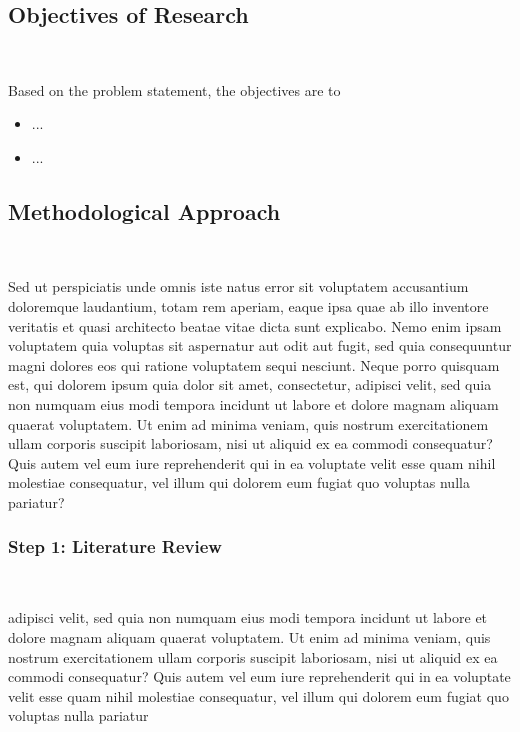 \subsection{Objectives of Research}\

Based on the problem statement, the objectives are to

\begin{itemize}
	\item ...
	\item ...
\end{itemize}


\subsection{Methodological Approach}\

Sed ut perspiciatis unde omnis iste natus error sit voluptatem accusantium doloremque laudantium, totam rem aperiam, eaque ipsa quae ab illo inventore veritatis et quasi architecto beatae vitae dicta sunt explicabo. Nemo enim ipsam voluptatem quia voluptas sit aspernatur aut odit aut fugit, sed quia consequuntur magni dolores eos qui ratione voluptatem sequi nesciunt. Neque porro quisquam est, qui dolorem ipsum quia dolor sit amet, consectetur, adipisci velit, sed quia non numquam eius modi tempora incidunt ut labore et dolore magnam aliquam quaerat voluptatem. Ut enim ad minima veniam, quis nostrum exercitationem ullam corporis suscipit laboriosam, nisi ut aliquid ex ea commodi consequatur? Quis autem vel eum iure reprehenderit qui in ea voluptate velit esse quam nihil molestiae consequatur, vel illum qui dolorem eum fugiat quo voluptas nulla pariatur?

\subsubsection*{Step 1: Literature Review}\

adipisci velit, sed quia non numquam eius modi tempora incidunt ut labore et dolore magnam aliquam quaerat voluptatem. Ut enim ad minima veniam, quis nostrum exercitationem ullam corporis suscipit laboriosam, nisi ut aliquid ex ea commodi consequatur? Quis autem vel eum iure reprehenderit qui in ea voluptate velit esse quam nihil molestiae consequatur, vel illum qui dolorem eum fugiat quo voluptas nulla pariatur \cite{IPCC}

